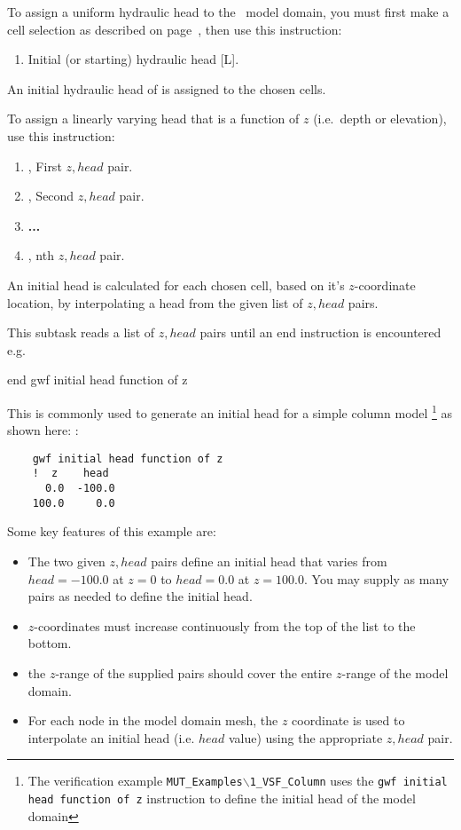 {To assign a uniform hydraulic head to the \gwf\ model domain, you must first make a cell selection as described on page~\pageref{page:cellSelect}, then use this instruction:

    {
        \squish
        \begin{enumerate}
        \item {}  Initial (or starting) hydraulic head [L].
        \end{enumerate}
          An initial hydraulic head  of  is assigned to the chosen cells.
    }

To assign a linearly varying head that is a function of $z$ (i.e.\ depth or elevation), use this instruction:
    {
    \squish
    \begin{enumerate}
    \item {},   First $z, head$ pair.
    \item {},   Second $z, head$ pair.
    \item \textbf{...}
    \item {},   nth $z, head$  pair.
    \end{enumerate}

     An initial head is calculated for each chosen cell, based on it's $z$-coordinate location, by interpolating a head from the given list of  $z, head$ pairs.

     This subtask reads a list of $z, head$ pairs until an \textsf{end} instruction is encountered e.g.\:

    {\Large \sf end gwf initial head function of z}
    }

This is commonly used to generate an initial head for a simple column model \footnote{The verification example \texttt{MUT\_Examples$\backslash$1\_VSF\_Column} uses the \texttt{gwf initial head function of z} instruction to define the initial head of the model domain} as shown here: :
\begin{verbatim}
    gwf initial head function of z
    !  z    head
      0.0  -100.0
    100.0     0.0
\end{verbatim}
Some key features of this example are:
\begin{itemize}
  \item The two given $z,head$ pairs define an initial head  that varies from $head=-100.0$ at $z=0$ to $head=0.0$ at $z=100.0$.  You may supply as many pairs as needed to define the initial head.
  \item $z$-coordinates must increase continuously from the top of the list to the bottom.
  \item the $z$-range of the supplied pairs should cover the entire $z$-range of the model domain.
  \item For each node in the model domain  mesh, the $z$ coordinate is used to interpolate an initial head (i.e. $head$ value) using the appropriate $z, head$ pair.
\end{itemize}

}
